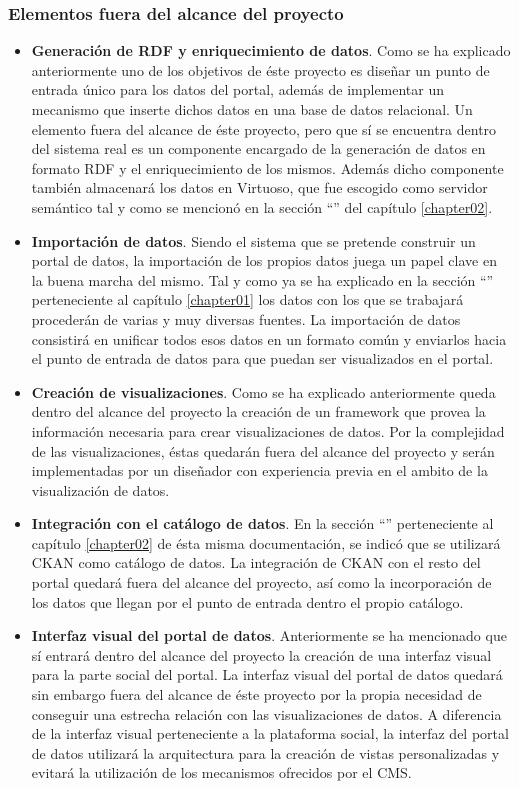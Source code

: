 \subsubsection{Elementos fuera del alcance del proyecto}
\begin{itemize}
\item \textbf{Generación de RDF y enriquecimiento de datos}.  Como se ha explicado anteriormente uno de los objetivos de éste proyecto es diseñar un punto de entrada único para los datos del portal, además de implementar un mecanismo que inserte dichos datos en una base de datos relacional.  Un elemento fuera del alcance de éste proyecto, pero que sí se encuentra dentro del sistema real es un componente encargado de la generación de datos en formato RDF y el enriquecimiento de los mismos.  Además dicho componente también almacenará los datos en Virtuoso, que fue escogido como servidor semántico tal y como se mencionó en la sección ``'' del capítulo \ref{chapter02}.
\item \textbf{Importación de datos}.  Siendo el sistema que se pretende construir un portal de datos, la importación de los propios datos juega un papel clave en la buena marcha del mismo.  Tal y como ya se ha explicado en la sección ``'' perteneciente al capítulo \ref{chapter01} los datos con los que se trabajará procederán de varias y muy diversas fuentes.  La importación de datos consistirá en unificar todos esos datos en un formato común y enviarlos hacia el punto de entrada de datos para que puedan ser visualizados en el portal.
\item \textbf{Creación de visualizaciones}.  Como se ha explicado anteriormente queda dentro del alcance del proyecto la creación de un framework que provea la información necesaria para crear visualizaciones de datos.  Por la complejidad de las visualizaciones, éstas quedarán fuera del alcance del proyecto y serán implementadas por un diseñador con experiencia previa en el ambito de la visualización de datos.
\item \textbf{Integración con el catálogo de datos}.  En la sección ``'' perteneciente al capítulo \ref{chapter02} de ésta misma documentación, se indicó que se utilizará CKAN como catálogo de datos.  La integración de CKAN con el resto del portal quedará fuera del alcance del proyecto, así como la incorporación de los datos que llegan por el punto de entrada dentro el propio catálogo. 
\item \textbf{Interfaz visual del portal de datos}.  Anteriormente se ha mencionado que sí entrará dentro del alcance del proyecto la creación de una interfaz visual para la parte social del portal.  La interfaz visual del portal de datos quedará sin embargo fuera del alcance de éste proyecto por la propia necesidad de conseguir una estrecha relación con las visualizaciones de datos.  A diferencia de la interfaz visual perteneciente a la plataforma social, la interfaz del portal de datos utilizará la arquitectura para la creación de vistas personalizadas y evitará la utilización de los mecanismos ofrecidos por el CMS.
\end{itemize}